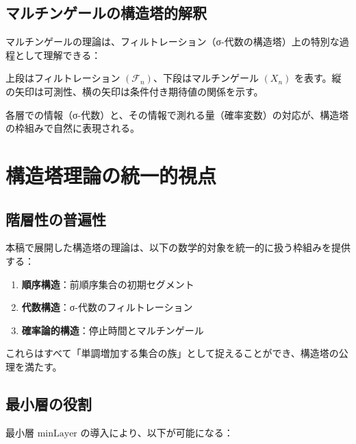 \documentclass[a4paper,12pt]{article}
\theoremstyle{definition}
\begin{document}
\subsection{マルチンゲールの構造塔的解釈}

マルチンゲールの理論は、フィルトレーション（σ-代数の構造塔）上の特別な過程として理解できる：

\begin{center}
\end{center}
\noindent
上段はフィルトレーション $(\mathcal{F}_n)$、下段はマルチンゲール $(X_n)$ を表す。縦の矢印は可測性、横の矢印は条件付き期待値の関係を示す。

各層での情報（σ-代数）と、その情報で測れる量（確率変数）の対応が、構造塔の枠組みで自然に表現される。

\section{構造塔理論の統一的視点}

\subsection{階層性の普遍性}

本稿で展開した構造塔の理論は、以下の数学的対象を統一的に扱う枠組みを提供する：

\begin{enumerate}
\item \textbf{順序構造}：前順序集合の初期セグメント
\item \textbf{代数構造}：σ-代数のフィルトレーション
\item \textbf{確率論的構造}：停止時間とマルチンゲール
\end{enumerate}

これらはすべて「単調増加する集合の族」として捉えることができ、構造塔の公理を満たす。

\subsection{最小層の役割}

最小層 $\text{minLayer}$ の導入により、以下が可能になる：
\end{document}
